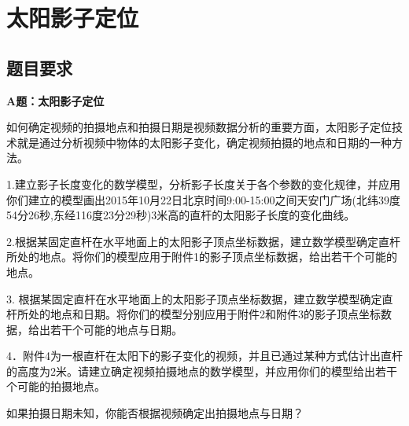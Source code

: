 \chapter{太阳影子定位}
\section{题目要求}
    \par
    \textbf{A题：太阳影子定位}
    \par
    如何确定视频的拍摄地点和拍摄日期是视频数据分析的重要方面，太阳影子定位技术就是通过分析视频中物体的太阳影子变化，确定视频拍摄的地点和日期的一种方法。
    \par
    1.建立影子长度变化的数学模型，分析影子长度关于各个参数的变化规律，并应用你们建立的模型画出2015年10月22日北京时间9:00-15:00之间天安门广场(北纬39度54分26秒,东经116度23分29秒)3米高的直杆的太阳影子长度的变化曲线。
    \par
    2.根据某固定直杆在水平地面上的太阳影子顶点坐标数据，建立数学模型确定直杆所处的地点。将你们的模型应用于附件1的影子顶点坐标数据，给出若干个可能的地点。
    \par
    3. 根据某固定直杆在水平地面上的太阳影子顶点坐标数据，建立数学模型确定直杆所处的地点和日期。将你们的模型分别应用于附件2和附件3的影子顶点坐标数据，给出若干个可能的地点与日期。
    \par
    4．附件4为一根直杆在太阳下的影子变化的视频，并且已通过某种方式估计出直杆的高度为2米。请建立确定视频拍摄地点的数学模型，并应用你们的模型给出若干个可能的拍摄地点。
    \par
    如果拍摄日期未知，你能否根据视频确定出拍摄地点与日期？
